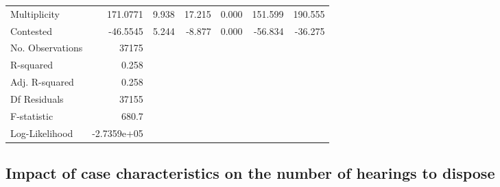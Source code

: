 {\begin{longtable}{@{}lrrrrrr@{}}
Multiplicity & 171.0771 & 9.938 & 17.215 & 0.000 & 151.599 & 190.555 \\
Contested & -46.5545 & 5.244 & -8.877 & 0.000 & -56.834 & -36.275\\
\bottomrule
No. Observations & 37175 & & & & &\\
R-squared & 0.258 & & & & & \\
Adj. R-squared& 0.258& & & & & \\
Df Residuals& 37155 & & & & &\\
F-statistic & 680.7 & & & & & \\
Log-Likelihood & -2.7359e+05 & & & & & \\
\bottomrule
\end{longtable}}

\pagebreak

\subsection{Impact of case characteristics on the number of hearings to dispose}
\label{sec:impact-case-char-1}
